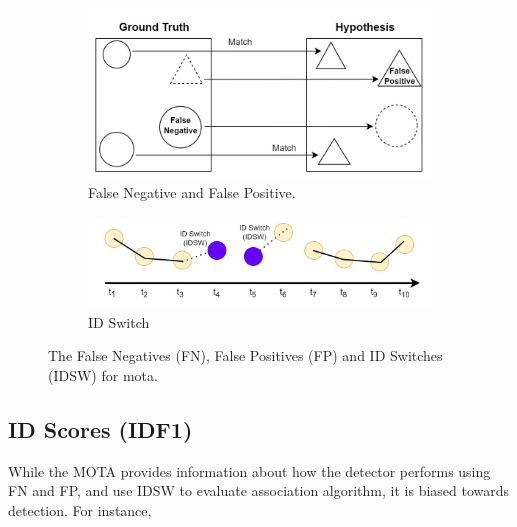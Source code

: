 \begin{figure}[H]
    \centering
    \begin{subfigure}[b]{\textwidth}
        \centering
        \includegraphics[width=\linewidth]{figures/chapter_tracking/MOTA_FP_FN.jpg}
        \caption{False Negative and False Positive.}
        \label{fig:track_mota_fp_fn} 
    \end{subfigure}
    \begin{subfigure}[b]{\textwidth}
        \centering
        \includegraphics[width=\linewidth]{figures/chapter_tracking/MOTA_IDSW.jpg}
        \caption{ID Switch}
        \label{fig:track_mota_idsw}
    \end{subfigure}
  \caption{The False Negatives (FN), False Positives (FP) and ID Switches (IDSW) for \acrfull{mota}.}
  \label{fig:tracking_mota}
\end{figure}

\subsection{ID Scores (IDF1)}

While the MOTA provides information about how the detector performs using FN and FP, and use IDSW to evaluate association algorithm, it is biased towards detection. For instance,

